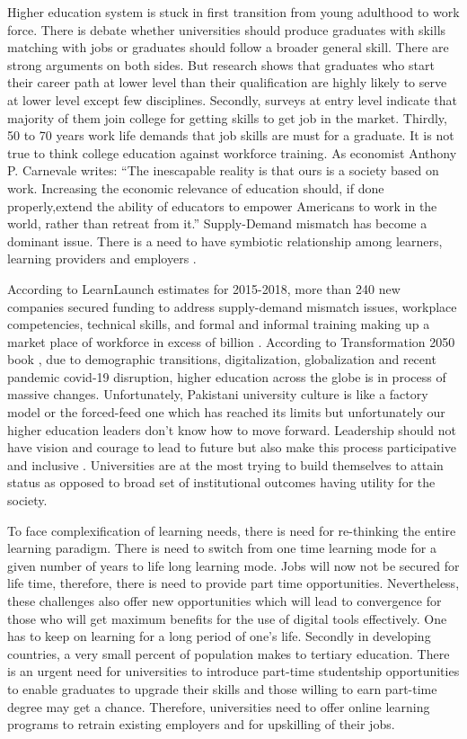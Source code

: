 \documentclass[
  12pt]{article}
\begin{document}
Higher education system is stuck in first transition from young
adulthood to work force. There is debate whether universities should
produce graduates with skills matching with jobs or graduates should
follow a broader general skill. There are strong arguments on both
sides. But research shows that graduates who start their career path at
lower level than their qualification are highly likely to serve at lower
level except few disciplines. Secondly, surveys at entry level indicate
that majority of them join college for getting skills to get job in the
market. Thirdly, 50 to 70 years work life demands that job skills are
must for a graduate. It is not true to think college education against
workforce training. As economist Anthony P. Carnevale writes: ``The
inescapable reality is that ours is a society based on work. Increasing
the economic relevance of education should, if done properly,extend the
ability of educators to empower Americans to work in the world, rather
than retreat from it.'' Supply-Demand mismatch has become a dominant
issue. There is a need to have symbiotic relationship among learners,
learning providers and employers \citet{AmericanAAS2018} .

According to LearnLaunch estimates for 2015-2018, more than 240 new
companies secured funding to address supply-demand mismatch issues,
workplace competencies, technical skills, and formal and informal
training making up a market place of workforce in excess of billion
\citet{Colin2018} . According to Transformation 2050 book
\citet{Sohail2018} , due to demographic transitions, digitalization,
globalization and recent pandemic covid-19 disruption, higher education
across the globe is in process of massive changes. Unfortunately,
Pakistani university culture is like a factory model or the forced-feed
one which has reached its limits but unfortunately our higher education
leaders don't know how to move forward. Leadership should not have
vision and courage to lead to future but also make this process
participative and inclusive . Universities are at the most trying to
build themselves to attain status as opposed to broad set of
institutional outcomes having utility for the society.

To face complexification of learning needs, there is need for
re-thinking the entire learning paradigm. There is need to switch from
one time learning mode for a given number of years to life long learning
mode. Jobs will now not be secured for life time, therefore, there is
need to provide part time opportunities. Nevertheless, these challenges
also offer new opportunities which will lead to convergence for those
who will get maximum benefits for the use of digital tools effectively.
One has to keep on learning for a long period of one's life. Secondly in
developing countries, a very small percent of population makes to
tertiary education. There is an urgent need for universities to
introduce part-time studentship opportunities to enable graduates to
upgrade their skills and those willing to earn part-time degree may get
a chance. Therefore, universities need to offer online learning programs
to retrain existing employers and for upskilling of their jobs.
\end{document}
